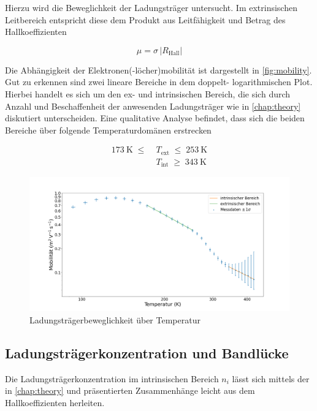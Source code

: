 Hierzu wird die Beweglichkeit der Ladungsträger untersucht. Im extrinsischen 
Leitbereich entspricht diese dem Produkt aus Leitfähigkeit und  Betrag des 
Hallkoeffizienten

\begin{equation}
\label{eq:mobility}
	\mu = \sigma\,|R_\text{Hall}|
\end{equation}

Die Abhängigkeit der Elektronen(-löcher)mobilität ist dargestellt in 
\autoref{fig:mobility}. Gut zu erkennen sind zwei lineare Bereiche in dem doppelt-
logarithmischen Plot. Hierbei handelt es sich um den ex- und intrinsischen Bereich,
die sich durch Anzahl und Beschaffenheit der anwesenden Ladungsträger wie in
\autoref{chap:theory} diskutiert unterscheiden. Eine qualitative Analyse befindet,
dass sich die beiden Bereiche über folgende Temperaturdomänen erstrecken

\begin{align*}
	\SI{173}{\kelvin}\;\leq\;&T_\text{ext}\;\leq\;\SI{253}{\kelvin} \\
	&T_\text{int}\;\geq\;\SI{343}{\kelvin}
\end{align*}

\begin{figure}
	\centering
	\includegraphics[width=1.0\textwidth]{./fig/mobility.png}
	\caption{Ladungsträgerbeweglichkeit über Temperatur}
	\label{fig:mobility}
\end{figure}

\subsection{Ladungsträgerkonzentration und Bandlücke}
\label{ssec:charge-carrier-concentration}

Die Ladungsträgerkonzentration im intrinsischen Bereich $n_i$ lässt sich mittels der 
in \autoref{chap:theory} und  \cite{Manual} präsentierten Zusammenhänge leicht aus 
dem Hallkoeffizienten herleiten.

